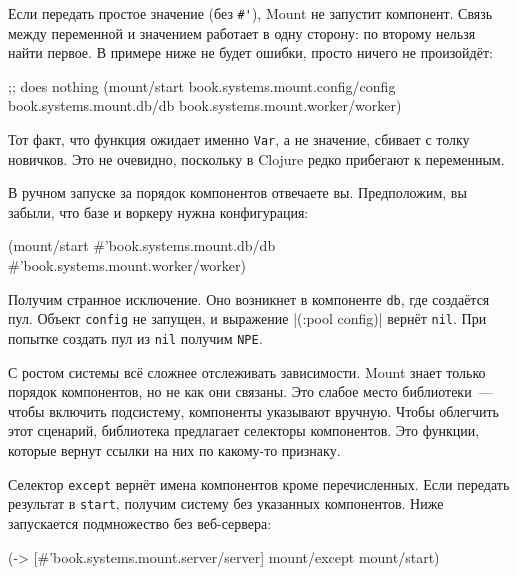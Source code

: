 Если передать простое значение (без \verb|#'|), Mount не запустит
компонент. Связь между переменной и значением работает в одну сторону: по
второму нельзя найти первое. В примере ниже не будет ошибки, просто ничего не
произойдёт:

\begin{english}
  \begin{clojure}
;; does nothing
(mount/start
  book.systems.mount.config/config
  book.systems.mount.db/db
  book.systems.mount.worker/worker)
  \end{clojure}
\end{english}


Тот факт, что функция ожидает именно \verb|Var|, а не значение, сбивает с толку
новичков. Это не очевидно, поскольку в Clojure редко прибегают к переменным.

В ручном запуске за порядок компонентов отвечаете вы. Предположим, вы забыли,
что базе и воркеру нужна конфигурация:

\begin{english}
  \begin{clojure}
(mount/start
  #'book.systems.mount.db/db
  #'book.systems.mount.worker/worker)
  \end{clojure}
\end{english}

Получим странное исключение. Оно возникнет в компоненте \verb|db|, где создаётся
пул. Объект \verb|config| не запущен, и выражение \spverb|(:pool config)| вернёт
\verb|nil|. При попытке создать пул из \verb|nil| получим \verb|NPE|.

С ростом системы всё сложнее отслеживать зависимости. Mount знает только порядок
компонентов, но не как они связаны. Это слабое место библиотеки~--- чтобы
включить подсистему, компоненты указывают вручную. Чтобы облегчить этот
сценарий, библиотека предлагает селекторы компонентов. Это функции, которые
вернут ссылки на них по какому-то признаку.

Селектор \verb|except| вернёт имена компонентов кроме перечисленных. Если
передать результат в \verb|start|, получим систему без указанных
компонентов. Ниже запускается подмножество без веб-сервера:

\begin{english}
  \begin{clojure}
(-> [#'book.systems.mount.server/server]
    mount/except
    mount/start)
  \end{clojure}
\end{english}

